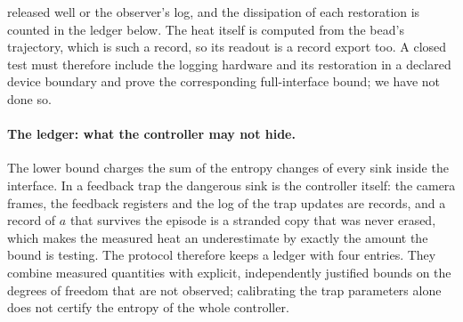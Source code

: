 released well or the observer's log, and the dissipation of each restoration is counted in the ledger below. The heat itself is computed from the bead's trajectory, which is such a record, so its readout is a record export too. A closed test must therefore include the logging hardware and its restoration in a declared device boundary and prove the corresponding full-interface bound; we have not done so.

\paragraph{The ledger: what the controller may not hide.} The lower bound charges the sum of the entropy changes of every sink inside the interface. In a feedback trap the dangerous sink is the controller itself: the camera frames, the feedback registers and the log of the trap updates are records, and a record of $a$ that survives the episode is a stranded copy that was never erased, which makes the measured heat an underestimate by exactly the amount the bound is testing. The protocol therefore keeps a ledger with four entries. They combine measured quantities with explicit, independently justified bounds on the degrees of freedom that are not observed; calibrating the trap parameters alone does not certify the entropy of the whole controller.
